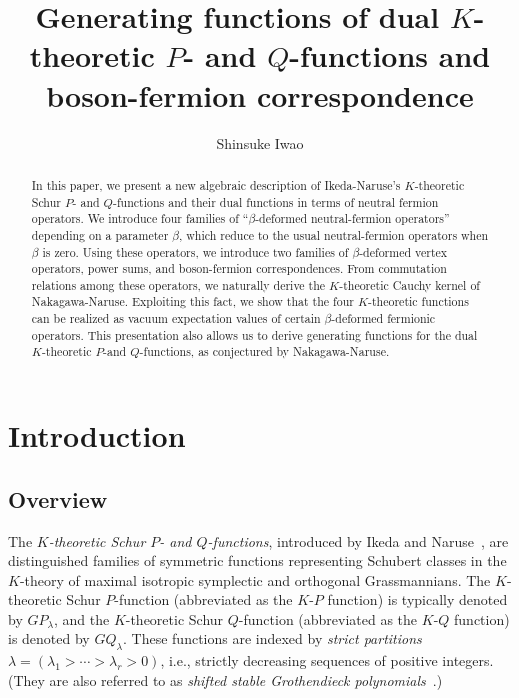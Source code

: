 \documentclass{amsart}
\title[Generating functions of dual $K$-theoretic $P$- and $Q$-functions]{Generating functions of dual $K$-theoretic $P$- and $Q$-functions and boson-fermion correspondence}
\author[S. Iwao]{Shinsuke Iwao}
\begin{document}
\maketitle


\begin{abstract}
In this paper, we present a new algebraic description of Ikeda-Naruse's $K$-theoretic Schur $P$- and $Q$-functions and their dual functions in terms of neutral fermion operators. 
We introduce four families of ``$\beta$-deformed neutral-fermion operators'' depending on a parameter $\beta$, which reduce to the usual neutral-fermion operators when $\beta$ is zero.
Using these operators, we introduce two families of $\beta$-deformed vertex operators, power sums, and boson-fermion correspondences.
From commutation relations among these operators, we naturally derive the $K$-theoretic Cauchy kernel of Nakagawa-Naruse. 
Exploiting this fact, we show that the four $K$-theoretic functions can be realized as vacuum expectation values of certain $\beta$-deformed fermionic operators.
This presentation also allows us to derive generating functions for the dual $K$-theoretic $P$-and $Q$-functions, as conjectured by Nakagawa-Naruse.
\end{abstract}


\section{Introduction}



\subsection{Overview}\label{sec:Background}

The \textit{$K$-theoretic Schur $P$- and $Q$-functions}, introduced by Ikeda and Naruse~\cite{IKEDA201322}, are distinguished families of symmetric functions representing Schubert classes in the $K$-theory of maximal isotropic symplectic and orthogonal Grassmannians.  
The $K$-theoretic Schur $P$-function (abbreviated as the $K$-$P$ function) is typically denoted by \( GP_\lambda \), and the $K$-theoretic Schur $Q$-function (abbreviated as the $K$-$Q$ function) is denoted by \( GQ_\lambda \).  
These functions are indexed by \textit{strict partitions} \( \lambda = (\lambda_1 > \cdots > \lambda_r > 0) \), i.e., strictly decreasing sequences of positive integers.  
(They are also referred to as \textit{shifted stable Grothendieck polynomials}~\cite{lewis2024combinatorial}.)
\end{document}
